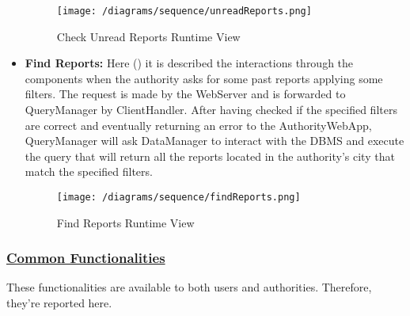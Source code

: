 \begin{itemize}
				\begin{figure}[h!]
					\centering
					\texttt{[image: /diagrams/sequence/unreadReports.png]}
					\caption{\label{fig:unreadReportsRuntime} Check Unread Reports Runtime View}
				\end{figure}
			
				\item \textbf{Find Reports:} Here () it is described the interactions through the components when the authority asks for some past reports applying some filters. The request is made by the WebServer and is forwarded to QueryManager by ClientHandler. After having checked if the specified filters are correct and eventually returning an error to the AuthorityWebApp, QueryManager will ask DataManager to interact with the DBMS and execute the query that will return all the reports located in the authority’s city that match the specified filters.
				
				\begin{figure}[h!]
					\centering
					\texttt{[image: /diagrams/sequence/findReports.png]}
					\caption{\label{fig:findReportsRuntime} Find Reports Runtime View}
				\end{figure}
			\end{itemize}
		
		\subsubsection[Common Functionalities]{\hyperlink{toc}{Common Functionalities}}
			\label{sec:commonFunctionalitiesRuntime}
			
			These functionalities are available to both users and authorities. Therefore, they're reported here.
			
